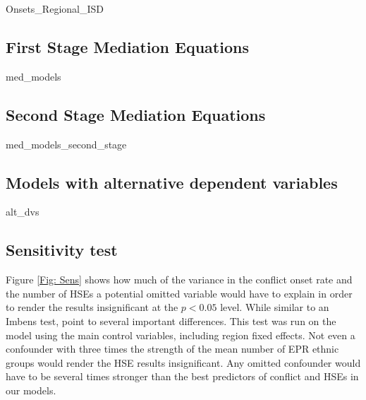 {Onsets_Regional_ISD}
\clearpage

\subsection{First Stage Mediation Equations}

{med_models}
\clearpage
    
\subsection{Second Stage Mediation Equations}

\clearpage
{med_models_second_stage}
\clearpage  

\subsection{Models with alternative dependent variables}

{alt_dvs}
\clearpage  

\subsection{Sensitivity test}

Figure \ref{Fig: Sens} shows how much of the variance in the conflict onset rate
and the number of HSEs a potential omitted variable would have to explain in
order to render the results insignificant at the $p<0.05$ level. While similar
to an Imbens test, \citet{Cinelli2020} point to several important differences.
This test was run on the model using the main control variables, including
region fixed effects. Not even a confounder with three times the strength of the
mean number of EPR ethnic groups would render the HSE results insignificant. Any
omitted confounder would have to be several times stronger than the best
predictors of conflict and HSEs in our models.



